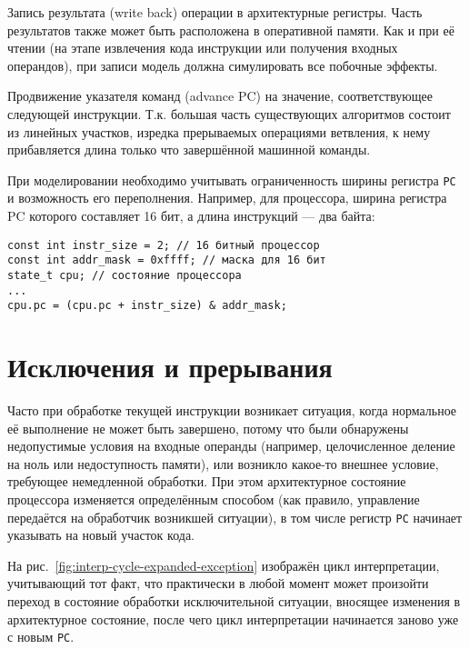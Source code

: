 \begin{enumerate*}
\item Запись результата (\abbr write back) операции в архитектурные регистры. Часть результатов также может быть расположена в оперативной памяти. Как и при её чтении (на этапе извлечения кода инструкции или получения входных операндов), при записи модель должна симулировать все побочные эффекты.

\item Продвижение указателя команд (\abbr advance PC) на значение, соответствующее следующей инструкции. Т.к. большая часть существующих алгоритмов состоит из линейных участков, изредка прерываемых операциями ветвления, к нему прибавляется длина только что завершённой машинной команды.

При моделировании необходимо учитывать ограниченность ширины регистра \texttt{PC} и возможность его переполнения. Например, для процессора, ширина регистра PC которого составляет 16 бит, а длина инструкций --- два байта:

\begin{lstlisting}
const int instr_size = 2; // 16 битный процессор
const int addr_mask = 0xffff; // маска для 16 бит
state_t cpu; // состояние процессора
...
cpu.pc = (cpu.pc + instr_size) & addr_mask;
\end{lstlisting}

\end{enumerate*}

\section{Исключения и прерывания}

Часто при обработке текущей инструкции возникает ситуация, когда нормальное её выполнение не может быть завершено, потому что  были обнаружены недопустимые условия на входные операнды (например, целочисленное деление на ноль или недоступность памяти), или возникло какое-то внешнее условие, требующее немедленной обработки. При этом архитектурное состояние процессора изменяется определённым способом (как правило, управление передаётся на обработчик возникшей ситуации), в том числе регистр \texttt{PC} начинает указывать на новый участок кода. %

На рис.~\ref{fig:interp-cycle-expanded-exception} изображён цикл интерпретации, учитывающий тот факт, что практически в любой момент может произойти переход в состояние обработки исключительной ситуации, вносящее изменения в архитектурное состояние, после чего цикл интерпретации начинается заново уже с новым \texttt{PC}.

